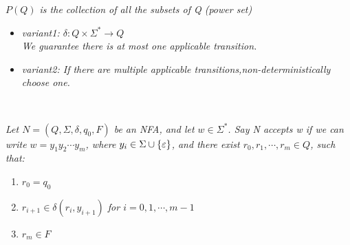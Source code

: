 \documentclass{article}
\begin{document}
\begin{remark}
    \textit{$P(Q)$ is the collection of all the subsets of Q (power set)}
\end{remark}

\begin{itemize}
    \item \textit{variant1: $\delta: Q\times\Sigma^*\rightarrow Q$\\We guarantee there is at most one applicable transition.}
    \item \textit{variant2: If there are multiple applicable transitions,non-deterministically choose one.}
\end{itemize}

\begin{defn}
    \

    \textit{Let $N = (Q,\Sigma,\delta,q_0,F)$ be an NFA, and let $w\in \Sigma ^*$. Say N accepts w if we can write $w = y_1y_2\cdots y_m$, where $y_i\in \Sigma\cup\{\varepsilon\}$, and there exist $r_0,r_1,\cdots,r_m\in Q$, such that:}

    \begin{enumerate}
        \item $r_0 = q_0$
        \item \textit{$r_{i+1} \in \delta(r_i,y_{i+1})$ for $i = 0,1,\cdots,m-1$}
        \item $r_m\in F$
    \end{enumerate}
\end{defn}

\end{document}
